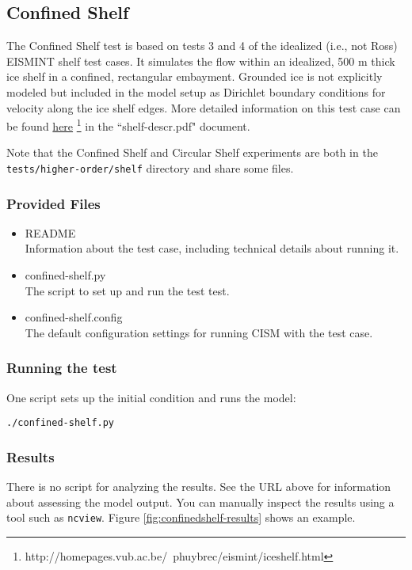 \subsection{Confined Shelf}
The Confined Shelf test is based on tests 3 and 4 of the idealized (i.e., not Ross) EISMINT shelf test 
cases.  It simulates the flow within an idealized, 500 m thick ice shelf in a 
confined, rectangular embayment.  Grounded ice is not explicitly modeled but included in the 
model setup as Dirichlet boundary conditions for velocity along the ice shelf edges.
More detailed information on this test case can be found 
\href{http://homepages.vub.ac.be/~phuybrec/eismint/iceshelf.html}{here}
\footnote{http://homepages.vub.ac.be/~phuybrec/eismint/iceshelf.html} in the 
``shelf-descr.pdf" document.

Note that the Confined Shelf and Circular Shelf experiments are both in the 
\texttt{tests/higher-order/shelf} directory and share some files.

\subsubsection{Provided Files}

\begin{itemize}
	\item README \\
		Information about the test case, including technical details about running it.
	\item confined-shelf.py \\
		The script to set up and run the test test.
	\item confined-shelf.config \\
  The default configuration settings for running CISM with the test case.
\end{itemize}

\subsubsection{Running the test}
One script sets up the initial condition and runs the model:

\texttt{./confined-shelf.py}

\subsubsection{Results}
There is no script for analyzing the results.  See the URL above for information 
about assessing the model output.
You can manually inspect the results using a tool such as \texttt{ncview}.
Figure \ref{fig:confinedshelf-results} shows an example.

